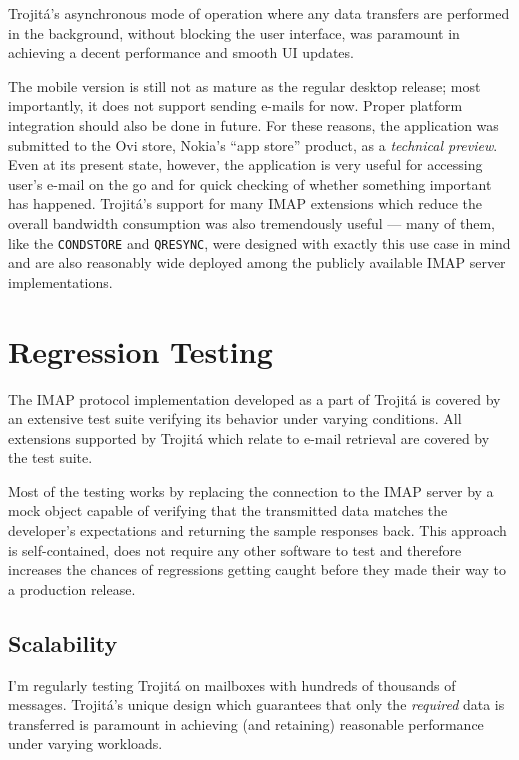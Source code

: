 \documentclass[trojita]{subfiles}
\begin{document}
Trojitá's asynchronous mode of operation where any data transfers are performed in the background, without blocking the
user interface, was paramount in achieving a decent performance and smooth UI updates.

The mobile version is still not as mature as the regular desktop release; most importantly, it does not support sending
e-mails for now.  Proper platform integration should also be done in future.  For these reasons, the application was
submitted to the Ovi store, Nokia's ``app store'' product, as a {\em technical preview}.  Even at its present state,
however, the application is very useful for accessing user's e-mail on the go and for quick checking of whether
something important has happened.  Trojitá's support for many IMAP extensions which reduce the overall bandwidth
consumption was also tremendously useful --- many of them, like the {\tt CONDSTORE} and {\tt QRESYNC}, were designed
with exactly this use case in mind and are also reasonably wide deployed among the publicly available IMAP server
implementations.

\section{Regression Testing}

The IMAP protocol implementation developed as a part of Trojitá is covered by an extensive test suite verifying its
behavior under varying conditions.  All extensions supported by Trojitá which relate to e-mail retrieval are covered by
the test suite.

Most of the testing works by replacing the connection to the IMAP server by a mock object capable of verifying that the
transmitted data matches the developer's expectations and returning the sample responses back.  This approach is
self-contained, does not require any other software to test and therefore increases the chances of regressions getting
caught before they made their way to a production release.

\subsection{Scalability}

I'm regularly testing Trojitá on mailboxes with hundreds of thousands of messages.  Trojitá's unique design which
guarantees that only the {\em required} data is transferred is paramount in achieving (and retaining) reasonable
performance under varying workloads.
\end{document}
